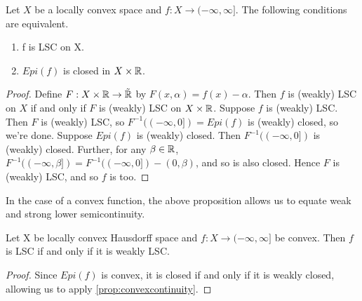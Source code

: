 \begin{prop}
    \label{prop:convexcontinuity}
    Let $X$ be a locally convex space and $f:X \to (-\infty,\infty]$. The following conditions are equivalent. 
    \begin{enumerate}
        \item f is LSC on X. %
        \item $Epi(f)$ is closed in $X \times \mathbb{R}$. 
    \end{enumerate} 
    \begin{proof}
        Define $F:X \times \mathbb{R} \to \tilde{\mathbb{R}}$ by $F(x,\alpha)=f(x)-\alpha$. 
        Then $f$ is (weakly) LSC on $X$ if and only if $F$ is (weakly) LSC on $X \times \mathbb{R}$. 
        Suppose $f$ is (weakly) LSC.
        Then $F$ is (weakly) LSC, so $F^{-1}((-\infty,0])=Epi(f)$ is (weakly) closed, so we're done. 
        Suppose $Epi(f)$ is (weakly) closed. 
        Then $F^{-1}((-\infty,0])$ is (weakly) closed. 
        Further, for any $\beta \in \mathbb{R}$, $F^{-1}((-\infty,\beta])=F^{-1}((-\infty,0])-(0,\beta)$, and so is also closed. 
        Hence $F$ is (weakly) LSC, and so $f$ is too. 
    \end{proof} 
\end{prop}
In the case of a convex function, the above proposition allows us to equate weak and strong lower semicontinuity.
\begin{cor}
    \label{cor:weaktostrongconvex}
    Let X be locally convex Hausdorff space  and $f:X \to (-\infty,\infty]$ be convex. Then $f$ is LSC if and only if it is weakly LSC. 
    \begin{proof}
        Since $Epi(f)$ is convex, it is closed if and only if it is weakly closed, allowing us to apply \ref{prop:convexcontinuity}.
    \end{proof} 
\end{cor} 
